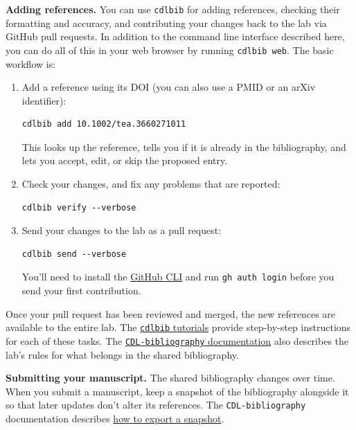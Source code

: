 \documentclass{tufte-book} %
\begin{document}
\medskip
\noindent\textbf{Adding references.}  You can use \texttt{cdlbib}
for adding references, checking their
formatting and accuracy, and contributing your changes back to the
lab via GitHub pull requests.  In addition to the command line
interface described here, you can do all of this in your web browser
by running \texttt{cdlbib web}.  The basic workflow is:
\begin{enumerate}
\item Add a reference using its DOI (you can also use a PMID or an
  arXiv identifier):
\begin{verbatim}
cdlbib add 10.1002/tea.3660271011
\end{verbatim}
  This looks up the reference, tells you if it is already in the
  bibliography, and lets you accept, edit, or skip the proposed
  entry.
\item Check your changes, and fix any problems that are reported:
\begin{verbatim}
cdlbib verify --verbose
\end{verbatim}
\item Send your changes to the lab as a pull request:
\begin{verbatim}
cdlbib send --verbose
\end{verbatim}
  You'll need to install the \href{https://cli.github.com}{GitHub
    CLI} and run \texttt{gh auth login} before you send your first
  contribution.
\end{enumerate}

\noindent Once your pull request has been reviewed and merged, the new
references are available to the entire lab.  The
\href{https://github.com/ContextLab/CDL-bibliography/blob/master/docs/tutorials.md}{\texttt{cdlbib}
  tutorials} provide step-by-step instructions for each of these
tasks.  The
\href{https://github.com/ContextLab/CDL-bibliography\#what-belongs-in-cdlbib}{\texttt{CDL-bibliography}
  documentation} also describes the lab's rules for what belongs in
the shared bibliography.

\medskip
\noindent\textbf{Submitting your manuscript.}  The shared bibliography
changes over time.  When you submit a manuscript, keep a snapshot of
the bibliography alongside it so that later updates don't alter its
references.  The \texttt{CDL-bibliography} documentation describes
\href{https://github.com/ContextLab/CDL-bibliography\#frozen-manuscript-copies-and-exports}{how
  to export a snapshot}.
\end{document}
